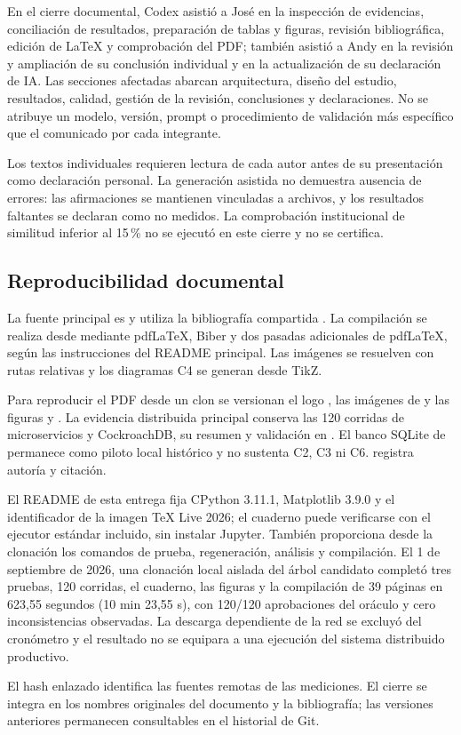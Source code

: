 \documentclass[12pt,a4paper]{article}
\begin{document}
En el cierre documental, Codex asistió a José en la inspección de evidencias, conciliación de resultados, preparación de tablas y figuras, revisión bibliográfica, edición de LaTeX y comprobación del PDF; también asistió a Andy en la revisión y ampliación de su conclusión individual y en la actualización de su declaración de IA. Las secciones afectadas abarcan arquitectura, diseño del estudio, resultados, calidad, gestión de la revisión, conclusiones y declaraciones. No se atribuye un modelo, versión, prompt o procedimiento de validación más específico que el comunicado por cada integrante.

Los textos individuales requieren lectura de cada autor antes de su presentación como declaración personal. La generación asistida no demuestra ausencia de errores: las afirmaciones se mantienen vinculadas a archivos, y los resultados faltantes se declaran como no medidos. La comprobación institucional de similitud inferior al 15\,\% no se ejecutó en este cierre y no se certifica.

\subsection{Reproducibilidad documental}
La fuente principal es  y utiliza la bibliografía compartida . La compilación se realiza desde  mediante pdfLaTeX, Biber y dos pasadas adicionales de pdfLaTeX, según las instrucciones del README principal. Las imágenes se resuelven con rutas relativas y los diagramas C4 se generan desde TikZ.

Para reproducir el PDF desde un clon se versionan el logo , las imágenes de  y las figuras  y . La evidencia distribuida principal conserva las 120 corridas de microservicios y CockroachDB, su resumen y validación en . El banco SQLite de  permanece como piloto local histórico y no sustenta C2, C3 ni C6.  registra autoría y citación.

El README de esta entrega fija CPython 3.11.1, Matplotlib 3.9.0 y el identificador de la imagen TeX Live 2026; el cuaderno puede verificarse con el ejecutor estándar incluido, sin instalar Jupyter. También proporciona desde la clonación los comandos de prueba, regeneración, análisis y compilación. El 1 de septiembre de 2026, una clonación local aislada del árbol candidato completó tres pruebas, 120 corridas, el cuaderno, las figuras y la compilación de 39 páginas en 623,55 segundos (10 min 23,55 s), con 120/120 aprobaciones del oráculo y cero inconsistencias observadas. La descarga dependiente de la red se excluyó del cronómetro y el resultado no se equipara a una ejecución del sistema distribuido productivo.

El hash enlazado identifica las fuentes remotas de las mediciones. El cierre se integra en los nombres originales del documento y la bibliografía; las versiones anteriores permanecen consultables en el historial de Git.

\clearpage
\printbibliography[heading=bibnumbered,title={Bibliografía}]
\end{document}
